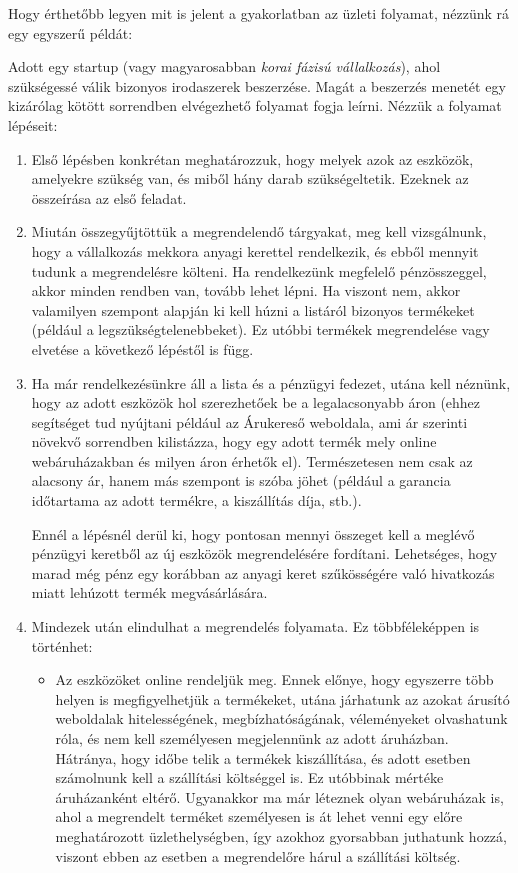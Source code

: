 Hogy érthetőbb legyen mit is jelent a gyakorlatban az üzleti folyamat, nézzünk rá egy egyszerű példát:

Adott egy startup (vagy magyarosabban \textit{korai fázisú vállalkozás}\cite{wiki}), ahol szükségessé válik bizonyos irodaszerek beszerzése. Magát a beszerzés menetét egy kizárólag kötött sorrendben elvégezhető folyamat fogja leírni. Nézzük a folyamat lépéseit:

\begin{enumerate}
\item Első lépésben konkrétan meghatározzuk, hogy melyek azok az eszközök, amelyekre szükség van, és miből hány darab szükségeltetik. Ezeknek az összeírása az első feladat.

\item Miután összegyűjtöttük a megrendelendő tárgyakat, meg kell vizsgálnunk, hogy a vállalkozás mekkora anyagi kerettel rendelkezik, és ebből mennyit tudunk a megrendelésre költeni. Ha rendelkezünk megfelelő pénzösszeggel, akkor minden rendben van, tovább lehet lépni. Ha viszont nem, akkor valamilyen szempont alapján ki kell húzni a listáról bizonyos termékeket (például a legszükségtelenebbeket). Ez utóbbi termékek megrendelése vagy elvetése a következő lépéstől is függ.

\item Ha már rendelkezésünkre áll a lista és a pénzügyi fedezet, utána kell néznünk, hogy az adott eszközök hol szerezhetőek be a legalacsonyabb áron (ehhez segítséget tud nyújtani például az Árukereső\cite{arukereso} weboldala, ami ár szerinti növekvő sorrendben kilistázza, hogy egy adott termék mely online webáruházakban és milyen áron érhetők el). Természetesen nem csak az alacsony ár, hanem más szempont is szóba jöhet (például a garancia időtartama az adott termékre, a kiszállítás díja, stb.).

Ennél a lépésnél derül ki, hogy pontosan mennyi összeget kell a meglévő pénzügyi keretből az új eszközök megrendelésére fordítani. Lehetséges, hogy marad még pénz egy korábban az anyagi keret szűkösségére való hivatkozás miatt lehúzott termék megvásárlására.

\item Mindezek után elindulhat a megrendelés folyamata. Ez többféleképpen is történhet:

\begin{itemize}
\item Az eszközöket online rendeljük meg. Ennek előnye, hogy egyszerre több helyen is megfigyelhetjük a termékeket, utána járhatunk az azokat árusító weboldalak hitelességének, megbízhatóságának, véleményeket olvashatunk róla, és nem kell személyesen megjelennünk az adott áruházban. Hátránya, hogy időbe telik a termékek kiszállítása, és adott esetben számolnunk kell a szállítási költséggel is. Ez utóbbinak mértéke áruházanként eltérő. Ugyanakkor ma már léteznek olyan webáruházak is, ahol a megrendelt terméket személyesen is át lehet venni egy előre meghatározott üzlethelységben, így azokhoz gyorsabban juthatunk hozzá, viszont ebben az esetben a megrendelőre hárul a szállítási költség.


\end{itemize}
\end{enumerate}
